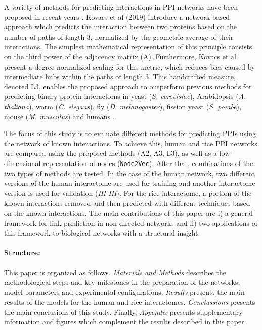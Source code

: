 A variety of methods for predicting interactions in PPI networks have
been proposed in recent years \cite{Chang2016PPI,Chen2019PPI,Kotlyar2015PPI}.
Kovacs et al (2019) introduce a network-based approach which predicts
the interaction between two proteins based on the number of paths
of length 3, normalized by the geometric average of their interactions.
The simplest mathematical representation of this principle consists
on the third power of the adjacency matrix (A\textthreesuperior).
Furthermore, Kovacs et al present a degree-normalized scaling for
this metric, which reduces bias caused by intermediate hubs within
the paths of length 3. This handcrafted measure, denoted L3, enables
the proposed approach to outperform previous methods for predicting
binary protein interactions in yeast (\emph{S. cerevisiae}), Arabidopsis
(\emph{A. thaliana}), worm (\emph{C. elegans}), fly (\emph{D. melanogaster}),
fission yeast (\emph{S. pombe}), mouse (\emph{M. musculus}) and humans
\cite{Kovacs2019}.


The focus of this study is to evaluate different methods for predicting
PPIs using the network of known interactions. To achieve this, human
and rice PPI networks are compared using the proposed methods (A2,
A3, L3), as well as a low-dimensional representation of nodes (\texttt{Node2Vec})\cite{Grover_2016}.
After that, combinations of the two types of methods are tested. In
the case of the human network, two different versions of the human
interactome \cite{Rolland2014Human} are used for training and another
interactome version is used for validation (\emph{HI-III})\cite{Kovacs2019}.
For the rice interactome, a portion of the known interactions removed
and then predicted with different techniques based on the known interactions.
The main contributions of this paper are i) a general framework for
link prediction in non-directed networks and ii) two applications
of this framework to biological networks with a structural insight.

\paragraph*{Structure:} This paper is organized as follows. \emph{Materials and Methods} describes
the methodological steps and key milestones in the preparation of
the networks, model parameters and experimental configurations.
\emph{Results} presents the main results of the models for the human and rice interactomes.
\emph{Conclussions} presents the main conclusions of this study. Finally, \emph{Appendix}
presents supplementary information and figures which complement the
results described in this paper.